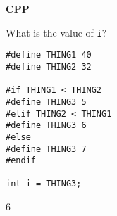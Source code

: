 \textbf{CPP}

What is the value of \texttt{i}?
\begin{verbatim}
#define THING1 40
#define THING2 32

#if THING1 < THING2
#define THING3 5
#elif THING2 < THING1
#define THING3 6
#else
#define THING3 7
#endif

int i = THING3;
\end{verbatim}
\begin{answer}
6
\end{answer}